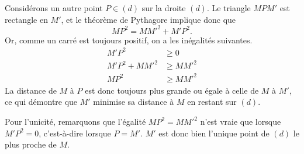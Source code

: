 \pf%
{}{
	Considérons un autre point $P \in (d)$ sur la droite $(d)$.
	Le triangle $MPM'$ est rectangle en $M'$, et le théorème de Pythagore implique donc que
		\[ MP^2 = MM'^2 + M'P^2. \]
	Or, comme un carré est toujours positif, on a les inégalités suivantes.
		\begin{align*}
			M'P^2 &\geq 0 \\
			M'P^2 + MM'^2 &\geq MM'^2 \\
			MP^2 &\geq MM'^2
		\end{align*}
	La distance de $M$ à $P$ est donc toujours plus grande ou égale à celle de $M$ à $M'$, ce qui démontre que $M'$ minimise sa distance à $M$ en restant sur $(d)$.
	
	Pour l'unicité, remarquons que l'égalité $MP^2 = MM'^2$ n'est vraie que lorsque $M'P^2 = 0$, c'est-à-dire lorsque $P=M'$. 
	$M'$ est donc bien l'unique point de $(d)$ le plus proche de $M$.
}

